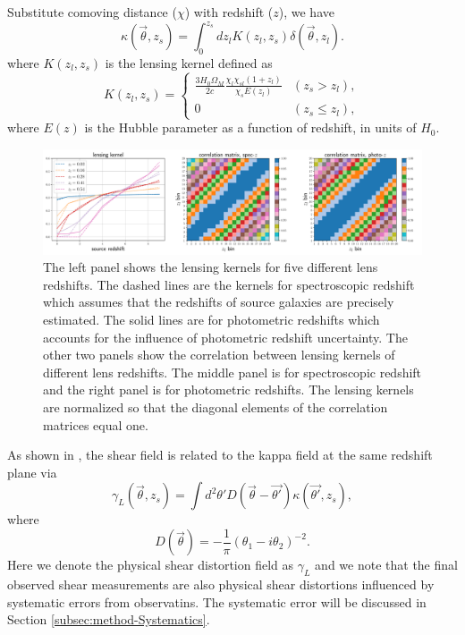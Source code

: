 \documentclass[twocolumn]{aastex62}
\begin{document}
Substitute comoving distance ($\chi$) with redshift ($z$), we have
\begin{equation}\label{eq-delta2kappa}
\kappa(\vec{\theta},z_s)=\int_0^{z_s} dz_l K(z_l,z_s)\delta(\vec{\theta},z_l).
\end{equation}
where $K(z_l,z_s)$ is the lensing kernel defined as
\begin{equation}
K(z_l,z_s) =
\begin{cases}
\frac{3H_0\Omega_M}{2 c} \frac{\chi_l \chi_{sl} (1+z_l)}{\chi_{s} E\left(z_l\right)} & (z_s>z_l),\\
0&(z_s \leq z_l),
\end{cases}
\end{equation}
where $E(z)$ is the Hubble parameter as a function of redshift, in units of $H_0$.

\begin{figure}[!t]
 \centering
 \includegraphics[width=1.\textwidth]{lensing_kernel.pdf}
 \caption{The left panel shows the lensing kernels for five different lens redshifts. The dashed lines are the 
        kernels for spectroscopic redshift which assumes that the redshifts of source galaxies are precisely 
        estimated. The solid lines are for photometric redshifts which accounts for the influence of photometric 
        redshift uncertainty. The other two panels show the correlation between lensing kernels of different 
        lens redshifts. The middle panel is for spectroscopic redshift and the right panel is for photometric 
        redshifts. The lensing kernels are normalized so that the diagonal elements of the correlation matrices
        equal one.}\label{fig-corlensKer}
\end{figure}

As shown in \citet{massMap-KS1993}, the shear field is related to the kappa field at the same redshift plane
via
\begin{equation}\label{eq-kappa2gamma}
\gamma_L(\vec{\theta},z_s) = \int  d^2 \theta' D(\vec{\theta}-\vec{\theta'}) \kappa(\vec{\theta'},z_s),
\end{equation}
where
\begin{equation}
D(\vec{\theta})=-\frac{1}{\pi}(\theta_1-i\theta_2)^{-2}.
\end{equation}
Here we denote the physical shear distortion field as $\gamma_L$ and we note that the final observed shear measurements 
are also physical shear distortions influenced by systematic errors from observatins. The systematic error will be discussed 
in Section \ref{subsec:method-Systematics}.
\end{document}
